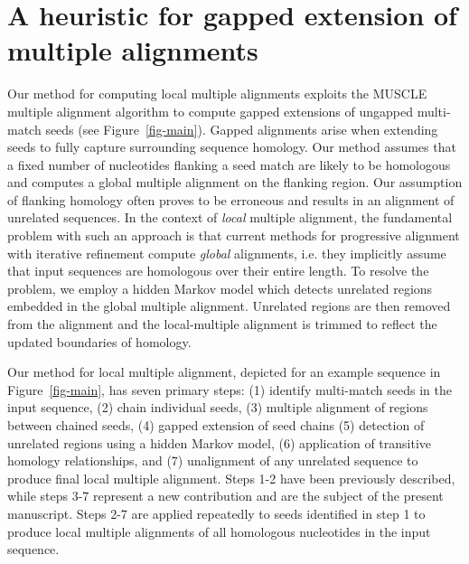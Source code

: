 \documentclass{llncs}
\begin{document}
\section{A heuristic for gapped extension of multiple alignments}
Our method for computing local multiple alignments exploits the MUSCLE
multiple alignment algorithm to compute gapped extensions of ungapped
multi-match seeds (see Figure~\ref{fig-main}). Gapped alignments arise
when extending seeds to fully capture surrounding sequence
homology. Our method assumes that a fixed number of nucleotides
flanking a seed match are likely to be homologous and computes a
global multiple alignment on the flanking region.  Our assumption of
flanking homology often proves to be erroneous and results in an
alignment of unrelated sequences.  In the context of \textit{local}
multiple alignment, the fundamental problem with such an approach is
that current methods for progressive alignment with iterative
refinement compute \textit{global} alignments, i.e. they implicitly
assume that input sequences are homologous over their entire length.
To resolve the problem, we employ a hidden Markov model which detects
unrelated regions embedded in the global multiple alignment.
Unrelated regions are then removed from the alignment and the
local-multiple alignment is trimmed to reflect the updated boundaries
of homology.

Our method for local multiple alignment, depicted for an example sequence in
Figure~\ref{fig-main}, has seven primary steps: (1) identify
multi-match seeds in the input sequence, (2) chain individual
seeds, (3) multiple alignment of regions between chained seeds, (4)
gapped extension of seed chains (5) detection of unrelated regions
using a hidden Markov model, (6) application of transitive homology
relationships, and (7) unalignment of any unrelated sequence to
produce final local multiple alignment.  Steps 1-2 have been previously
described\cite{ref-procrast}, while steps 3-7 represent a new contribution
and are the subject of the present manuscript. Steps 2-7 are applied
repeatedly to seeds identified in step 1 to produce local multiple
alignments of all homologous nucleotides in the input sequence.
\end{document}
